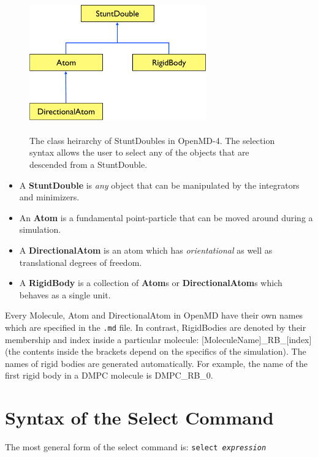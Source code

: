 \documentclass[]{book}
\begin{document}
\begin{figure}
\centering
\includegraphics[width=3in]{heirarchy.pdf}
\caption[Class heirarchy for StuntDoubles in {\sc OpenMD}-4]{ \\ The
class heirarchy of StuntDoubles in {\sc OpenMD}-4. The selection
syntax allows the user to select any of the objects that are descended
from a StuntDouble.}
\label{fig:heirarchy}
\end{figure}

\begin{itemize}
\item A {\bf StuntDouble} is {\it any} object that can be manipulated by the
integrators and minimizers. 
\item An {\bf Atom} is a fundamental point-particle that can be moved around during a simulation.
\item A {\bf DirectionalAtom} is an atom which has {\it orientational} as well as translational degrees of freedom.
\item A {\bf RigidBody} is a collection of {\bf Atom}s or {\bf
DirectionalAtom}s which behaves as a single unit.
\end{itemize} 

Every Molecule, Atom and DirectionalAtom in {\sc OpenMD} have their own names
which are specified in the {\tt .md} file. In contrast, RigidBodies are
denoted by their membership and index inside a particular molecule:
[MoleculeName]\_RB\_[index] (the contents inside the brackets
depend on the specifics of the simulation). The names of rigid bodies are
generated automatically. For example, the name of the first rigid body
in a DMPC molecule is DMPC\_RB\_0.

\section{\label{section:syntax}Syntax of the Select Command}

The most general form of the select command is: {\tt select {\it expression}}
\end{document}
